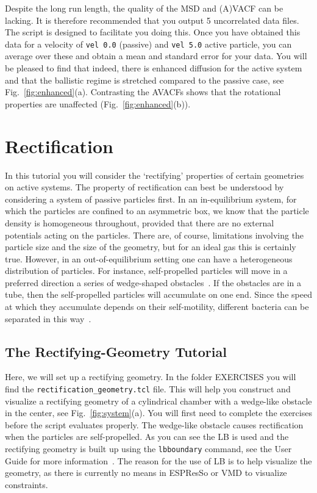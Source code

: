 \documentclass[aip,jcp,reprint,a4paper,onecolumn,amsmath]{revtex4-1}
\newcommand\code{\lstinline}
\newcommand{\es}{\mbox{\textsf{ESPResSo}}\xspace}
\newcommand\codees{\lstinline[language=espresso]}
\begin{document}
Despite the long run length, the quality of the MSD and (A)VACF can be lacking. It is therefore recommended that you output 5 uncorrelated data files. The script is designed to facilitate you doing this. Once you have obtained this data for a velocity of \codees{vel 0.0} (passive) and \codees{vel 5.0} active particle, you can average over these and obtain a mean and standard error for your data. You will be pleased to find that indeed, there is enhanced diffusion for the active system and that the ballistic regime is stretched compared to the passive case, see Fig.~\ref{fig:enhanced}(a). Contrasting the AVACFs shows that the rotational properties are unaffected (Fig.~\ref{fig:enhanced}(b)). 

\section{\label{sec:rectify}Rectification}

In this tutorial you will consider the `rectifying' properties of certain geometries on active systems. The property of rectification can best be understood by considering a system of passive particles first. In an in-equilibrium system, for which the particles are confined to an asymmetric box, we know that the particle density is homogeneous throughout, provided that there are no external potentials acting on the particles. There are, of course, limitations involving the particle size and the size of the geometry, but for an ideal gas this is certainly true. However, in an out-of-equilibrium setting one can have a heterogeneous distribution of particles. For instance, self-propelled particles will move in a preferred direction a series of wedge-shaped obstacles~\cite{Berdakin13a}. If the obstacles are in a tube, then the self-propelled particles will accumulate on one end. Since the speed at which they accumulate depends on their self-motility, different bacteria can be separated in this way~\cite{Berdakin13b}. 

\subsection{\label{sub:rgtut}The Rectifying-Geometry Tutorial}

Here, we will set up a rectifying geometry. In the folder EXERCISES you will find the \code{rectification_geometry.tcl} file. This will help you construct and visualize a rectifying geometry of a cylindrical chamber with a wedge-like obstacle in the center, see Fig.~\ref{fig:system}(a). You will first need to complete the exercises before the script evaluates properly. The wedge-like obstacle causes rectification when the particles are self-propelled. As you can see the LB is used and the rectifying geometry is built up using the \codees{lbboundary} command, see the User Guide for more information~\cite{UG}. The reason for the use of LB is to help visualize the geometry, as there is currently no means in \es{} or VMD to visualize constraints. 
\end{document}
